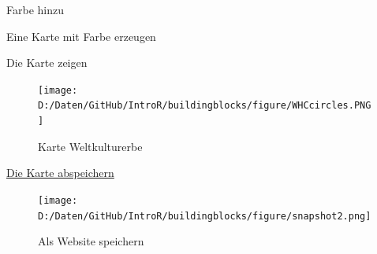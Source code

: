 \documentclass[ignorenonframetext,]{beamer}
\newenvironment{Shaded}{\begin{snugshade}}{\end{snugshade}}
\newcommand{\KeywordTok}[1]{\textcolor[rgb]{0.26,0.66,0.93}{\textbf{#1}}}
\newcommand{\DataTypeTok}[1]{\textcolor[rgb]{0.74,0.68,0.62}{\underline{#1}}}
\newcommand{\StringTok}[1]{\textcolor[rgb]{0.02,0.61,0.04}{#1}}
\newcommand{\OperatorTok}[1]{\textcolor[rgb]{0.74,0.68,0.62}{#1}}
\newcommand{\NormalTok}[1]{\textcolor[rgb]{0.74,0.68,0.62}{#1}}
\begin{document}
\begin{frame}[fragile]{Farbe hinzu}

\begin{Shaded}
\end{Shaded}

\end{frame}

\begin{frame}[fragile]{Eine Karte mit Farbe erzeugen}

\begin{Shaded}
\end{Shaded}

\end{frame}

\begin{frame}{Die Karte zeigen}

\begin{figure}
\centering
\texttt{[image: D:/Daten/GitHub/IntroR/buildingblocks/figure/WHCcircles.PNG]}
\caption{Karte Weltkulturerbe}
\end{figure}

\end{frame}

\begin{frame}{\href{http://www.r-bloggers.com/interactive-mapping-with-leaflet-in-r-2/}{Die
Karte abspeichern}}

\begin{figure}
\centering
\texttt{[image: D:/Daten/GitHub/IntroR/buildingblocks/figure/snapshot2.png]}
\caption{Als Website speichern}
\end{figure}

\end{frame}
\end{document}
